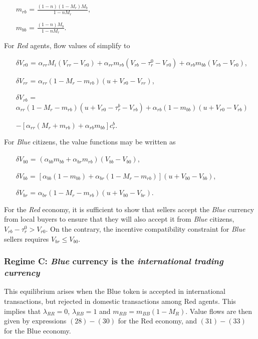 \begin{itemize}
    \item[$m_{rb}$] = $\frac{(1-n)(1-M_r)M_b}{1-nM_r}$,
    \item[$m_{bb}$] = $\frac{(1-n)M_b}{1-nM_r}$.
\end{itemize}

For \textit{Red} agents, flow values of  simplify to
\begin{itemize}
    \item[$\delta V_{r0}$] = $\alpha_{rr}M_{i}(V_{rr}-V_{r0}) + \alpha_{rr}m_{rb}(V_{rb}-\tau_r^0-V_{r0}) + \alpha_{rb}m_{bb}(V_{rb}-V_{r0})$,
    \item[$\delta V_{rr}$] = $\alpha_{rr}(1-M_{r}-m_{rb})(u+V_{r0}-V_{rr})$,
    \item[$\delta V_{rb}$] = $\alpha_{rr}(1-M_{r}-m_{rb})(u+V_{r0}-\tau_r^b-V_{rb}) + \alpha_{rb}(1-m_{bb})(u+V_{r0}-V_{rb})$
    \item[] $- \left[\alpha_{rr}(M_r+m_{rb})+\alpha_{rb}m_{bb}\right]c_r^b$.
\end{itemize}

For \textit{Blue} citizens, the value functions  may be written as
\begin{itemize}
    \item[$\delta V_{b0}$] = $(\alpha_{bb}m_{bb}+\alpha_{br}m_{rb})(V_{bb}-V_{b0})$,
    \item[$\delta V_{bb}$] = $\left[\alpha_{bb}(1-m_{bb})+\alpha_{br}(1-M_r-m_{rb})\right](u+V_{b0}-V_{bb})$,
    \item[$\delta V_{br}$] = $\alpha_{br}(1-M_{r}-m_{rb})(u+V_{b0}-V_{br})$.
\end{itemize}

For the \textit{Red} economy, it is sufficient to show that sellers accept the \textit{Blue} currency from local buyers to ensure that they will also accept it from \textit{Blue} citizens, $V_{rb}-\tau_r^0>V_{r0}$. On the contrary, the incentive compatibility constraint for \textit{Blue} sellers requires $V_{br} \leq V_{b0}$.

\subsubsection{Regime C: \textit{Blue} currency is the \textit{international trading currency}}
This equilibrium arises when the Blue token is accepted in international transactions, but rejected in domestic transactions among Red agents. This implies that $\lambda_{RR}=0$, $\lambda_{RB}=1$ and $m_{RB}=m_{BB}(1-M_{R})$. Value flows are then given by expressions $(28)-(30)$ for the Red economy, and $(31)-(33)$ for the Blue economy.

